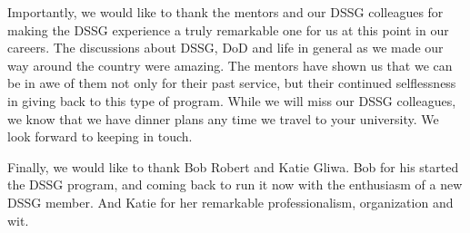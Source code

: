 \documentclass[11pt]{dssg}
\begin{document}
Importantly, we would like to thank the mentors and our DSSG colleagues for making the DSSG experience a truly remarkable one for us at this point in our careers. The discussions about DSSG, DoD and life in general as we made our way around the country were amazing. The mentors have shown us that we can be in awe of them not only for their past service, but their continued selflessness in giving back to this type of program. While we will miss our DSSG colleagues, we know that we have dinner plans any time we travel to your university. We look forward to keeping in touch. 

Finally, we would like to thank Bob Robert and Katie Gliwa. Bob for his started the DSSG program, and coming back to run it now with the enthusiasm of a new DSSG member. And Katie for her remarkable professionalism, organization and wit. 


\newpage


\normalsize
\end{document}
